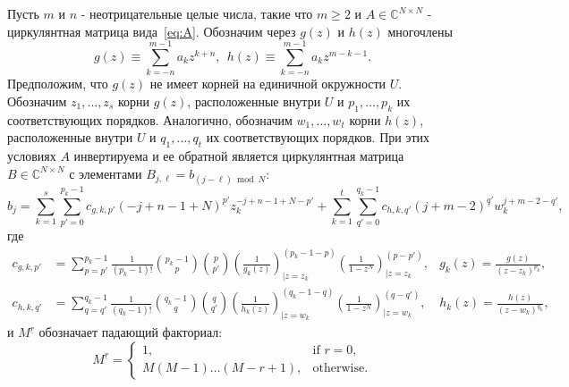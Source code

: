 \begin{theorem}\label{thm:general-inverse}
	Пусть $m$ и $n$ - неотрицательные целые числа, такие что $m \ge 2$ и $A \in \mathbb{C}^{N\times N}$ - циркулянтная матрица вида~\eqref{eq:A}.
	Обозначим через $g(z)$ и $h(z)$ многочлены
	\[
	g(z) \equiv \sum_{k=-n}^{m-1}a_{k}z^{k+n},~~h(z) \equiv \sum_{k=-n}^{m-1}a_{k}z^{m-k-1}.
	\]
	Предположим, что $g(z)$ не имеет корней на единичной окружности $U$.
	Обозначим $z_1, \dots, z_s$ корни $g(z)$, расположенные внутри $U$ и $p_1, \dots, p_k$ их соответствующих порядков.
	Аналогично, обозначим $w_1, \dots, w_t$ корни $h(z)$, расположенные внутри $U$ и $q_1, \dots, q_t$ их соответствующих порядков.
	При этих условиях $A$ инвертируема и ее обратной является циркулянтная матрица $B\in\mathbb{C}^{N\times N}$ с элементами $B_{j,\ell} = b_{(j-\ell)\bmod N}:$
	\[
	b_j
	=
	\sum_{k=1}^s\sum_{p'=0}^{p_k-1}
	c_{g,k,p'}
	(-j+n-1+N)^{\underline{p}'} z_k^{-j+n-1+N-p'}
	+
	\sum_{k=1}^t\sum_{q'=0}^{q_k-1}
	c_{h,k,q'}
	(j+m-2)^{\underline{q}'}w_k^{j+m-2-q'},
	\]
	где
	\begin{align*}
	c_{g,k,p'}
	&=
	\sum_{p=p'}^{p_k-1}\frac{1}{(p_k - 1)!}\binom{p_k-1}{p}\binom{p}{p'}
	\left(\frac{1}{g_k(z)}\right)^{(p_k-1-p)}_{\big|{z=z_k}}
	\left(\frac{1}{1-z^{N}}\right)^{(p-p')}_{\big|{z=z_k}},
	&
	g_k(z) = \frac{g(z)}{(z-z_k)^{p_k}},
	\\
	c_{h,k,q'}
	&=
	\sum_{q=q'}^{q_k-1}
	\frac{1}{(q_k - 1)!}\binom{q_k-1}{q}\binom{q}{q'}
	\left(\frac{1}{h_k(z)}\right)^{(q_k-1-q)}_{\big|{z=w_k}}
	\left(\frac{1}{1-z^{N}}\right)^{(q-q')}_{\big|{z=w_k}},
	&
	h_k(z) = \frac{h(z)}{(z-w_k)^{q_k}},
	\end{align*}
	и
	$M^{\underline{r}}$ обозначает падающий факториал:
	\[
	M^{\underline{r}} = 
	\begin{cases}
	1, & \text{if } r = 0, \\
	M(M-1)\dots(M-r+1), & \text{otherwise}.
	\end{cases}
	\]
\end{theorem}
